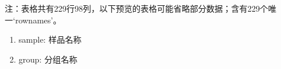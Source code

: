 \documentclass[
]{article}
\providecommand{\tightlist}{%
  \setlength{\itemsep}{0pt}\setlength{\parskip}{0pt}}
\begin{document}
\begin{center}\begin{tcolorbox}[colback=gray!10, colframe=gray!50, width=0.9\linewidth, arc=1mm, boxrule=0.5pt]注：表格共有229行98列，以下预览的表格可能省略部分数据；含有229个唯一`rownames'。
\end{tcolorbox}
\end{center}
\begin{center}\begin{tcolorbox}[colback=gray!10, colframe=gray!50, width=0.9\linewidth, arc=1mm, boxrule=0.5pt]\begin{enumerate}\tightlist
\item sample:  样品名称
\item group:  分组名称
\end{enumerate}\end{tcolorbox}
\end{center}
\end{document}
